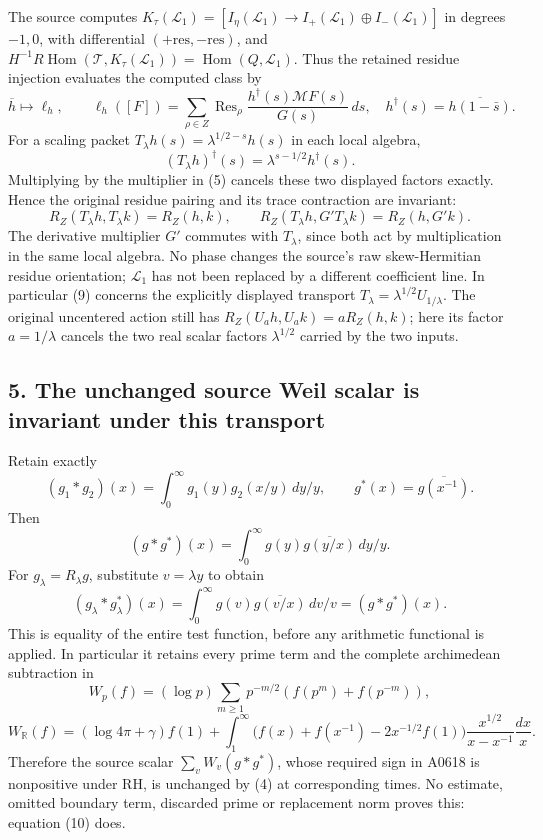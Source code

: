 The source computes
\(K_\tau(\mathcal L_1)=[I_\eta(\mathcal L_1)\to I_+(\mathcal L_1)\oplus I_-(\mathcal L_1)]\)
in degrees \(-1,0\), with differential
\((+\mathrm{res},-\mathrm{res})\), and
\(H^{-1}R\operatorname{Hom}(\mathcal T,K_\tau(\mathcal L_1))=\operatorname{Hom}(Q,\mathcal L_1)\).
Thus the retained residue injection evaluates the computed class by \[
\overline h\longmapsto\ell_h,\qquad
\ell_h([F])=\sum_{\rho\in Z}\operatorname{Res}_\rho
\frac{h^\dagger(s)\mathcal MF(s)}{G(s)}\,ds,
\quad h^\dagger(s)=\overline{h(1-\bar s)}.
\tag{8}
\] For a scaling packet \(T_\lambda h(s)=\lambda^{1/2-s}h(s)\) in each
local algebra, \[
(T_\lambda h)^\dagger(s)=\lambda^{s-1/2}h^\dagger(s).
\] Multiplying by the multiplier in (5) cancels these two displayed
factors exactly. Hence the original residue pairing and its trace
contraction are invariant: \[
R_Z(T_\lambda h,T_\lambda k)=R_Z(h,k),\qquad
R_Z(T_\lambda h,G'T_\lambda k)=R_Z(h,G'k).
\tag{9}
\] The derivative multiplier \(G'\) commutes with \(T_\lambda\), since
both act by multiplication in the same local algebra. No phase changes
the source's raw skew-Hermitian residue orientation; \(\mathcal L_1\)
has not been replaced by a different coefficient line. In particular (9)
concerns the explicitly displayed transport
\(T_\lambda=\lambda^{1/2}U_{1/\lambda}\). The original uncentered action
still has \(R_Z(U_ah,U_ak)=aR_Z(h,k)\); here its factor \(a=1/\lambda\)
cancels the two real scalar factors \(\lambda^{1/2}\) carried by the two
inputs.

\subsection{5. The unchanged source Weil scalar is invariant under this
transport}\label{proof09:the-unchanged-source-weil-scalar-is-invariant-under-this-transport}

Retain exactly \[
(g_1*g_2)(x)=\int_0^\infty g_1(y)g_2(x/y)\,dy/y,
\qquad g^*(x)=\overline{g(x^{-1})}.
\] Then \[
(g*g^*)(x)=\int_0^\infty g(y)\overline{g(y/x)}\,dy/y.
\] For \(g_\lambda=R_\lambda g\), substitute \(v=\lambda y\) to obtain
\[
\boxed{(g_\lambda*g_\lambda^*)(x)=\int_0^\infty g(v)\overline{g(v/x)}\,dv/v=(g*g^*)(x).}
\tag{10}
\] This is equality of the entire test function, before any arithmetic
functional is applied. In particular it retains every prime term and the
complete archimedean subtraction in \[
W_p(f)=(\log p)\sum_{m\ge1}p^{-m/2}(f(p^m)+f(p^{-m})),
\] \[
W_{\mathbb R}(f)=(\log4\pi+\gamma)f(1)+
\int_1^\infty\bigl(f(x)+f(x^{-1})-2x^{-1/2}f(1)\bigr)
\frac{x^{1/2}}{x-x^{-1}}\frac{dx}{x}.
\] Therefore the source scalar \(\sum_vW_v(g*g^*)\), whose required sign
in A0618 is nonpositive under RH, is unchanged by (4) at corresponding
times. No estimate, omitted boundary term, discarded prime or
replacement norm proves this: equation (10) does.

